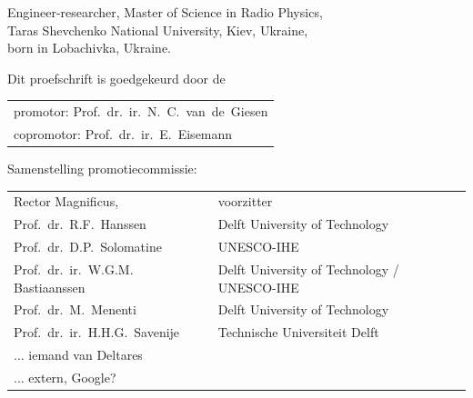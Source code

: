 \begin{titlepage}
\begin{center}
\bigskip
\bigskip

Engineer-researcher, Master of Science in Radio Physics, \\
Taras Shevchenko National University, Kiev, Ukraine, \\
born in Lobachivka, Ukraine.

\vspace*{2\bigskipamount}

\end{center}

\clearpage
\thispagestyle{empty}

\noindent Dit proefschrift is goedgekeurd door de

\medskip\noindent
\begin{tabular}{l}
    promotor: Prof.\ dr.\ ir.\ N.\ C.\ van\ de\ Giesen \\
    copromotor: Prof.\ dr.\ ir.\ E.\ Eisemann
\end{tabular}

\bigskip
\noindent Samenstelling promotiecommissie:

\medskip\noindent
\begin{tabular}{p{5cm}l}
    Rector Magnificus, & voorzitter \\

    Prof.\ dr.\ R.F.\ Hanssen & Delft University of Technology \\
    
	Prof.\ dr.\ D.P.\ Solomatine & UNESCO-IHE \\

	Prof.\ dr.\ ir.\ W.G.M. Bastiaanssen & Delft University of Technology / UNESCO-IHE \\

    Prof.\ dr.\ M.\ Menenti & Delft University of Technology \\
    
    Prof.\ dr.\ ir.\ H.H.G.\ Savenije & Technische Universiteit Delft \\

    ... iemand van Deltares & \\
    
    ... extern, Google? & \\
\end{tabular}

\medskip


\end{titlepage}
